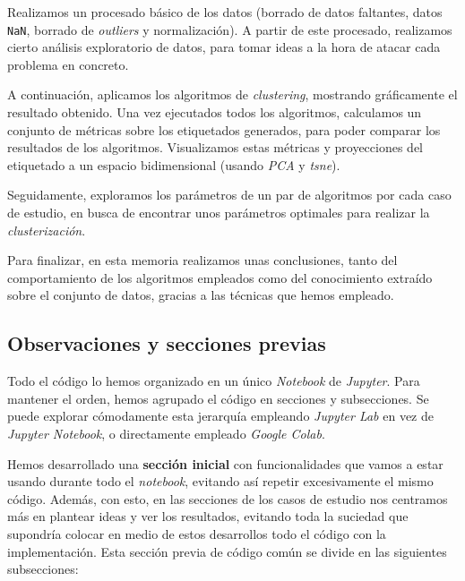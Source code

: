 \documentclass[11pt]{article}
\begin{document}
Realizamos un procesado básico de los datos (borrado de datos faltantes, datos \lstinline{NaN}, borrado de \emph{outliers} y normalización). A partir de este procesado, realizamos cierto análisis exploratorio de datos, para tomar ideas a la hora de atacar cada problema en concreto.

A continuación, aplicamos los algoritmos de \emph{clustering}, mostrando gráficamente el resultado obtenido. Una vez ejecutados todos los algoritmos, calculamos un conjunto de métricas sobre los etiquetados generados, para poder comparar los resultados de los algoritmos. Visualizamos estas métricas y proyecciones del etiquetado a un espacio bidimensional (usando \emph{PCA} y \emph{tsne}).

Seguidamente, exploramos los parámetros de un par de algoritmos por cada caso de estudio, en busca de encontrar unos parámetros optimales para realizar la \emph{clusterización}.

Para finalizar, en esta memoria realizamos unas conclusiones, tanto del comportamiento de los algoritmos empleados como del conocimiento extraído sobre el conjunto de datos, gracias a las técnicas que hemos empleado.

\subsection{Observaciones y secciones previas}

Todo el código lo hemos organizado en un único \emph{Notebook} de \emph{Jupyter}. Para mantener el orden, hemos agrupado el código en secciones y subsecciones. Se puede explorar cómodamente esta jerarquía empleando \emph{Jupyter Lab} en vez de \emph{Jupyter Notebook}, o directamente empleado \emph{Google Colab}.

Hemos desarrollado una \textbf{sección inicial} con funcionalidades que vamos a estar usando durante todo el \emph{notebook}, evitando así repetir excesivamente el mismo código. Además, con esto, en las secciones de los casos de estudio nos centramos más en plantear ideas y ver los resultados, evitando toda la suciedad que supondría colocar en medio de estos desarrollos todo el código con la implementación. Esta sección previa de código común se divide en las siguientes subsecciones:
\end{document}
